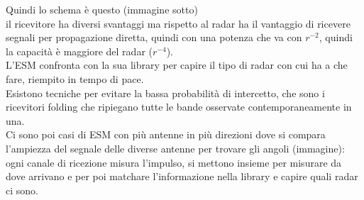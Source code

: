 \documentclass[oneside, 12pt]{extbook}
\begin{document}
Quindi lo schema è questo (immagine sotto)
\\il ricevitore ha diversi svantaggi ma rispetto al radar ha il vantaggio di ricevere segnali per propagazione diretta, quindi con una potenza che va con $r^{-2}$, quindi la capacità è maggiore del radar ($r^{-4}$).\\
L'ESM confronta con la sua library per capire il tipo di radar con cui ha a che fare, riempito in tempo di pace.\\
Esistono tecniche per evitare la bassa probabilità di intercetto, che sono i ricevitori folding che ripiegano tutte le bande osservate contemporaneamente in una.\\
Ci sono poi casi di ESM con più antenne in più direzioni dove si compara l'ampiezza del segnale delle diverse antenne per trovare gli angoli (immagine):\\
ogni canale di ricezione misura l'impulso, si mettono insieme per misurare da dove arrivano e per poi matchare l'informazione nella library e capire quali radar ci sono.\\
\end{document}
